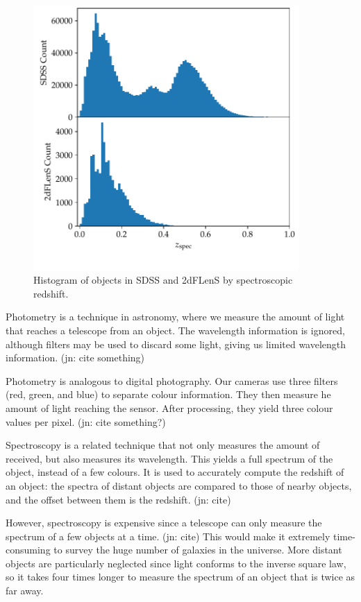 \documentclass[11pt,twoside,openright]{report}
\newcommand\jn[1]{{\color{red}(jn: #1)}}
\begin{document}
  \begin{figure}
    \centering
    \includegraphics[width=0.9\textwidth]{zpec_hist.pdf}
    \caption{Histogram of objects in SDSS and 2dFLenS by spectroscopic redshift.}
    \label{fig:spec_hist}
  \end{figure}

  Photometry is a technique in astronomy, where we measure the amount of light that reaches a telescope from an object. The wavelength information is ignored, although filters may be used to discard some light, giving us limited wavelength information. \jn{cite something}

  Photometry is analogous to digital photography. Our cameras use three filters (red, green, and blue) to separate colour information. They then measure he amount of light reaching the sensor. After processing, they yield three colour values per pixel. \jn{cite something?}

  Spectroscopy is a related technique that not only measures the amount of received, but also measures its wavelength. This yields a full spectrum of the object, instead of a few colours. It is used to accurately compute the redshift of an object: the spectra of distant objects are compared to those of nearby objects, and the offset between them is the redshift. \jn{cite}

  However, spectroscopy is expensive since a telescope can only measure the spectrum of a few objects at a time. \jn{cite} This would make it extremely time-consuming to survey the huge number of galaxies in the universe. More distant objects are particularly neglected since light conforms to the inverse square law, so it takes four times longer to measure the spectrum of an object that is twice as far away.
\end{document}
